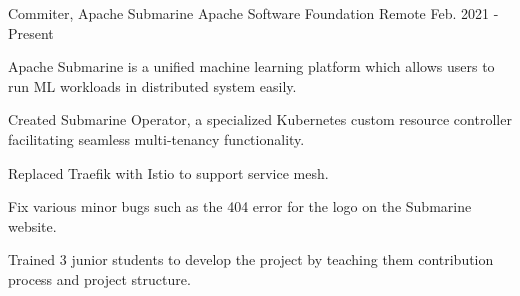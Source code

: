 

\begin{cventries}

  \cventry
  {Commiter, Apache Submarine} %
  {Apache Software Foundation} %
  {Remote} %
  {Feb. 2021 - Present} %
  {
    \begin{cvitems} %
      \item {Apache Submarine is a unified machine learning platform which allows users to run ML workloads in distributed system easily.}
      \item {Created Submarine Operator, a specialized Kubernetes custom resource controller facilitating seamless multi-tenancy functionality.}
      \item {Replaced Traefik with Istio to support service mesh.}
      \item {Fix various minor bugs such as the 404 error for the logo on the Submarine website.}
      \item {Trained 3 junior students to develop the project by teaching them contribution process and project structure.}
    \end{cvitems}
  }

\end{cventries}
